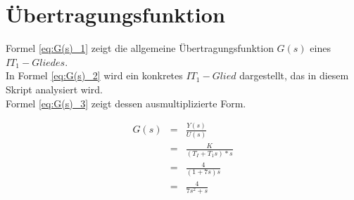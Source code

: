 \section{Übertragungsfunktion}

Formel \ref{eq:G(s)_1} zeigt die allgemeine Übertragungsfunktion $G(s)$ eines $IT_1-Gliedes$.\\ In Formel \ref{eq:G(s)_2} wird ein konkretes $IT_1-Glied$ dargestellt, das in diesem Skript analysiert wird. \\ Formel \ref{eq:G(s)_3} zeigt dessen ausmultiplizierte Form.

\begin{eqnarray}
G(s) &=& \frac{Y(s)}{U(s)} \\
\label{eq:G(s)_1}
&=& \frac{K}{(T_I+T_1s)*s} \\
\label{eq:G(s)_2}
&=& \frac{4}{(1+7s)s} \\
\label{eq:G(s)_3}
&=& \frac{4}{7s^2+s}
\end{eqnarray}